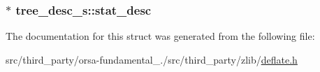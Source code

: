\subsubsection[{stat\+\_\+desc}]{$\ast$ tree\+\_\+desc\+\_\+s\+::stat\+\_\+desc}\label{structtree__desc__s_a7f237428776ee85058bb7f7f11900dd2}


The documentation for this struct was generated from the following file\+:\begin{DoxyCompactItemize}
\item 
src/third\+\_\+party/orsa-\/fundamental\+\_./src/third\+\_\+party/zlib/\hyperlink{deflate_8h}{deflate.\+h}\end{DoxyCompactItemize}

